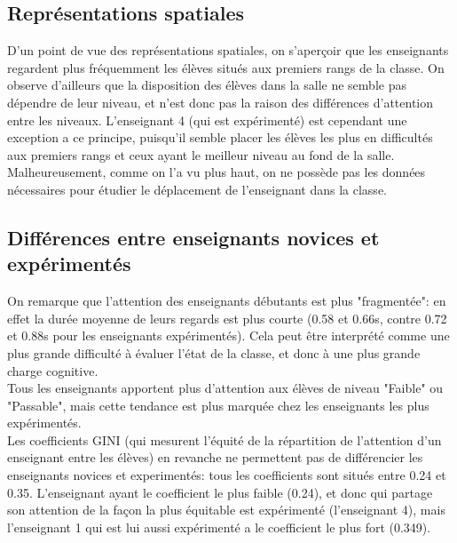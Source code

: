 \documentclass{article}
\begin{document}
\subsection{Représentations spatiales}
D'un point de vue des représentations spatiales, on s'aperçoir que les enseignants regardent plus fréquemment les élèves situés aux premiers rangs de la classe. On observe d'ailleurs que la disposition des élèves dans la salle ne semble pas dépendre de leur niveau, et n'est donc pas la raison des différences d'attention entre les niveaux. L'enseignant 4 (qui est expérimenté) est cependant une exception a ce principe, puisqu'il semble placer les élèves les plus en difficultés aux premiers rangs et ceux ayant le meilleur niveau au fond de la salle.\\
Malheureusement, comme on l'a vu plus haut, on ne possède pas les données nécessaires pour étudier le déplacement de l'enseignant dans la classe.

\subsection{Différences entre enseignants novices et expérimentés}
On remarque que l'attention des enseignants débutants est plus "fragmentée": en effet la durée moyenne de leurs regards est plus courte (0.58 et 0.66s, contre 0.72 et 0.88s pour les enseignants expérimentés). Cela peut être interprété comme une plus grande difficulté à évaluer l'état de la classe, et donc à une plus grande charge cognitive.\\
Tous les enseignants apportent plus d'attention aux élèves de niveau "Faible" ou "Passable", mais cette tendance est plus marquée chez les enseignants les plus expérimentés.\\
Les coefficients GINI (qui mesurent l'équité de la répartition de l'attention d'un enseignant entre les élèves) en revanche ne permettent pas de différencier les enseignants novices et experimentés: tous les coefficients sont situés entre 0.24 et 0.35. L'enseignant ayant le coefficient le plus faible (0.24), et donc qui partage son attention de la façon la plus équitable est expérimenté (l'enseignant 4), mais l'enseignant 1 qui est lui aussi expérimenté a le coefficient le plus fort (0.349).\\
\end{document}
